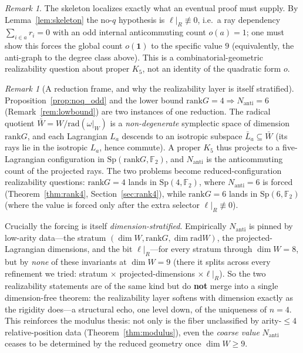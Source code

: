 \documentclass[11pt,a4paper]{article}
\theoremstyle{remark}
\newtheorem{remark}[theorem]{Remark}
\newcommand{\Sp}{\mathrm{Sp}}
\newcommand{\rad}{\mathrm{rad}}
\newcommand{\rank}{\mathrm{rank}}
\newcommand{\Nanti}{N_{\mathrm{anti}}}
\begin{document}
\begin{remark}
The skeleton localizes exactly what an eventual proof must supply. By
Lemma~\ref{lem:skeleton} the no-$q$ hypothesis is $\ell|_R\not\equiv0$, i.e.\ a ray
dependency $\sum_{i\in a}r_i=0$ with an odd internal anticommuting count
$o(a)=1$; one must show this forces the global count $o(\mathbf 1)$ to the specific
value $9$ (equivalently, the anti-graph to the degree class above). This is a
combinatorial-geometric realizability question about proper $K_5$, not an identity
of the quadratic form $o$.
\end{remark}

\begin{remark}[A reduction frame, and why the realizability layer is itself stratified]
\label{rem:reduction}
Proposition~\ref{prop:noq_odd} and the lower bound $\rank G=4\Rightarrow\Nanti=6$
(Remark~\ref{rem:lowbound}) are two instances of one reduction. The radical
quotient $\bar W=W/\rad(\omega|_W)$ is a \emph{non-degenerate} symplectic space of
dimension $\rank G$, and each Lagrangian $L_a$ descends to an isotropic subspace
$\bar L_a\subseteq\bar W$ (its rays lie in the isotropic $L_a$, hence commute).
A proper $K_5$ thus projects to a five-Lagrangian configuration in
$\Sp(\rank G,\mathbb F_2)$, and $\Nanti$ is the anticommuting count of the
projected rays. The two problems become reduced-configuration realizability
questions: $\rank G=4$ lands in $\Sp(4,\mathbb F_2)$, where $\Nanti=6$ is forced
(Theorem~\ref{thm:rank4}, Section~\ref{sec:rank4}), while $\rank G=6$ lands
in $\Sp(6,\mathbb F_2)$ (where the value is forced only after the extra selector
$\ell|_R\not\equiv0$).

Crucially the forcing is itself \emph{dimension-stratified}. Empirically $\Nanti$
is pinned by low-arity data---the stratum $(\dim W,\rank G,\dim\rad W)$, the
projected-Lagrangian dimensions, and the bit $\ell|_R$---for every stratum through
$\dim W=8$, but by \emph{none} of these invariants at $\dim W=9$ (there it splits
across every refinement we tried: stratum $\times$ projected-dimensions $\times
\ell|_R$). So the two realizability statements are of the same kind but do
\textbf{not} merge into a single dimension-free theorem: the realizability layer
softens with dimension exactly as the rigidity does---a structural echo, one level
down, of the uniqueness of $n=4$. This reinforces the modulus thesis: not only is
the fiber unclassified by arity-$\le4$ relative-position data
(Theorem~\ref{thm:modulus}), even the \emph{coarse value} $\Nanti$ ceases to be
determined by the reduced geometry once $\dim W\ge9$.
\end{remark}
\end{document}
